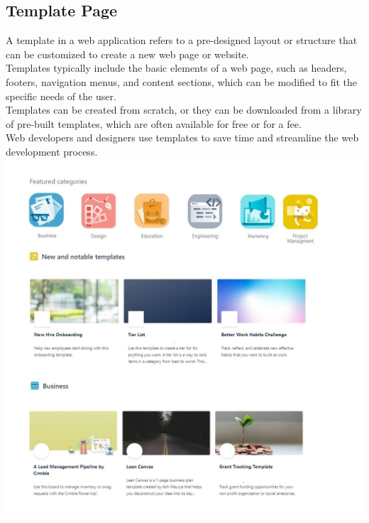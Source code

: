 \subsection{Template Page}

A template in a web application refers to a pre-designed layout or structure that can be customized to create a new web page or website.\\

Templates typically include the basic elements of a web page, such as headers, footers, navigation menus, and content sections, which can be modified to fit the specific needs of the user.\\

Templates can be created from scratch, or they can be downloaded from a library of pre-built templates, which are often available for free or for a fee.\\

Web developers and designers use templates to save time and streamline the web development process.
\includegraphics[width=0.8\columnwidth]{images/template.jpg}
